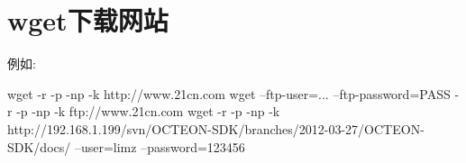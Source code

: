 \section{wget下载网站}
例如:
\begin{shellcmd}
wget -r -p -np -k http://www.21cn.com
wget --ftp-user=... --ftp-password=PASS  -r -p -np -k ftp://www.21cn.com
wget -r -p -np -k http://192.168.1.199/svn/OCTEON-SDK/branches/2012-03-27/OCTEON-SDK/docs/ --user=limz --password=123456
\end{shellcmd}


